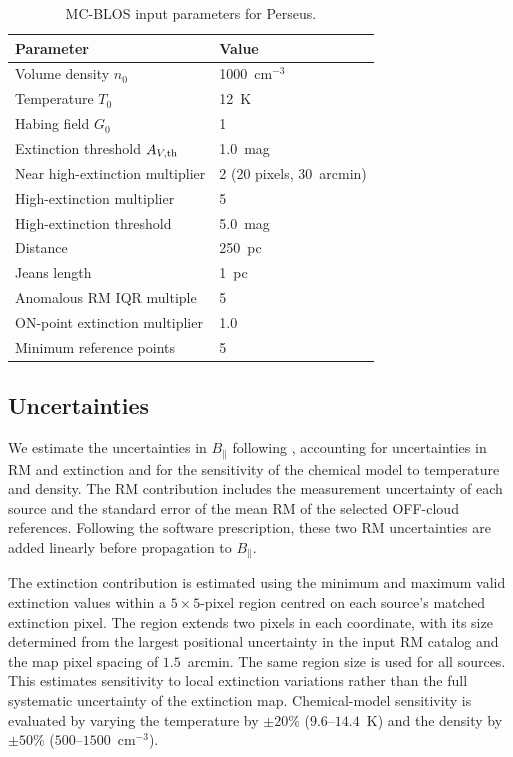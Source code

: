 \documentclass[twocolumn]{aastex701}
\begin{document}
  \begin{table}
  \centering
  \caption{MC-BLOS input parameters for Perseus.}
  \label{tab:params}
  \begin{tabular}{ll}
  \hline
  Parameter & Value \\
  \hline

  Volume density $n_0$ & 1000~cm$^{-3}$ \\
  Temperature $T_0$ & 12~K \\
  Habing field $G_0$ & 1 \\
  Extinction threshold $A_{V,\rm th}$ & 1.0~mag \\
  Near high-extinction multiplier & 2 (20 pixels, 30~arcmin) \\
  High-extinction multiplier & 5 \\
  High-extinction threshold & 5.0~mag \\
  Distance & 250~pc \\
  Jeans length & 1~pc \\
  Anomalous RM IQR multiple & 5 \\
  ON-point extinction multiplier & 1.0 \\
  Minimum reference points & 5 \\
  \hline
  \end{tabular}
  \end{table}

  \subsection{Uncertainties}

  We estimate the uncertainties in $B_\parallel$ following
  \citet{tahani2025mcblos}, accounting for uncertainties in RM and
  extinction and for the sensitivity of the chemical model to temperature
  and density. The RM contribution includes the measurement uncertainty
  of each source and the standard error of the mean RM of the selected
  OFF-cloud references. Following the software prescription, these two
  RM uncertainties are added linearly before propagation to
  $B_\parallel$.

  The extinction contribution is estimated using the minimum and maximum
  valid extinction values within a $5\times5$-pixel region centred on each
  source's matched extinction pixel. The region extends two pixels in
  each coordinate, with its size determined from the largest positional
  uncertainty in the input RM catalog and the map pixel spacing of
  $1.5$~arcmin. The same region size is used for all sources. This
  estimates sensitivity to local extinction variations rather than the
  full systematic uncertainty of the extinction map. Chemical-model
  sensitivity is evaluated by varying the temperature by $\pm20\%$
  ($9.6$--$14.4$~K) and the density by $\pm50\%$
  ($500$--$1500$~cm$^{-3}$).
\end{document}
